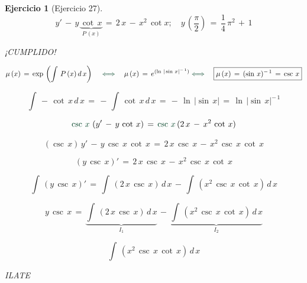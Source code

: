 \documentclass[a4paper,11pt]{book}
\newtheorem{ejer}{Ejercicio}[section]
\begin{document}
\begin{ejer}[Ejercicio 27] 

$$y'\,-\,y\,\underbrace{\cot\,x}_{P\,(x)}\,=\,2\,x\,-\,x^{2}\,\cot{x}; \quad y\,\left(\dfrac{\pi}{2} \right)\,=\,\dfrac{1}{4}\,\pi^{2}\,+\,1$$ 

  



  

¡CUMPLIDO! 

  


  

 $$\mu\,(x)\,=\,\exp\,\left(\int\,P\,(x)\,d\,x \right) \quad \textcolor{britishracinggreen}{\iff} \quad \mu\,(x)\,=\,e^{(\ln\,|\sin\,x|^{-\,1})} \textcolor{britishracinggreen}{\iff} \quad \boxed{\mu\,(x)\,=\,(\sin\,x)^{-\,1}\,=\,\csc\,x}$$ 

  

$$\int\,-\,\cot\,x\,d\,x\,=\,-\,\int\,\cot\,x\,d\,x\,=\,-\,\ln\,|\sin\,x|\,=\,\boxed{\ln\,|\sin\,x|^{-\,1}}$$ 

  

 $$\textcolor{britishracinggreen}{\csc\,x}\,\left(y'\,-\,y\,\cot\,x \right)\,=\,\textcolor{britishracinggreen}{\csc\,x}\,(2\,x\,-\,x^{2}\,\cot\,x) $$ 

  

$$(\csc\,x)\,y'\,-\,y\,\csc\,x\,\cot\,x\,=\,2\,x\,\csc\,x\,-\,x^{2}\,\csc\,x\,\cot\,x$$ 

  

$$\left(y\,\csc\,x \right)'\,=\,2\,x\,\csc\,x\,-\,x^{2}\,\csc\,x\,\cot\,x $$ 

  

 $$\int\,\left(y\,\csc\,x \right)'\,=\,\int\,\left( 2\,x\,\csc\,x \right)\,d\,x\,-\,\int\,\left(x^{2}\,\csc\,x\,\cot\,x \right)\,d\,x$$ 

  

$$y\,\csc\,x\,=\,\underbrace{\int\,\left( 2\,x\,\csc\,x \right)\,d\,x}_{I_{1}}\,-\,\underbrace{\int\,\left(x^{2}\,\csc\,x\,\cot\,x \right)\,d\,x}_{I_{2}}$$ 

  

\begin{tcolorbox}[colback=red!5!white,colframe=red!75!black,fonttitle=\bfseries,title=$I_{2}$]  

  

$$\int\,\left(x^{2}\,\csc\,x\,\cot\,x \right)\,d\,x$$ 

  

ILATE 


\end{tcolorbox}
\end{ejer}
\end{document}

